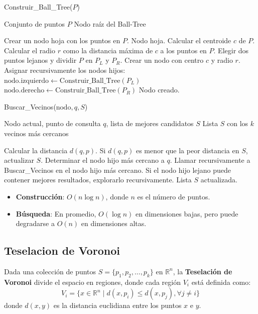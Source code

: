 \documentclass[titlepage,a4paper]{article}
\begin{document}
\begin{algorithm}
\caption{Construir\_Ball\_Tree(\( P \))}
\begin{algorithmic}[1]
\Require Conjunto de puntos \( P \)
\Ensure Nodo raíz del Ball-Tree

    \State Crear un nodo hoja con los puntos en \( P \).
    \State \Return Nodo hoja.
\EndIf
\State Calcular el centroide \( c \) de \( P \).
\State Calcular el radio \( r \) como la distancia máxima de \( c \) a los puntos en \( P \).
\State Elegir dos puntos lejanos y dividir \( P \) en \( P_L \) y \( P_R \).
\State Crear un nodo con centro \( c \) y radio \( r \).
\State Asignar recursivamente los nodos hijos:
\State \( \text{nodo.izquierdo} \gets \text{Construir\_Ball\_Tree}(P_L) \)
\State \( \text{nodo.derecho} \gets \text{Construir\_Ball\_Tree}(P_R) \)
\State \Return Nodo creado.
\end{algorithmic}
\end{algorithm}


\begin{algorithm}
\caption{Buscar\_Vecinos(\( \text{nodo}, q, S \))}
\begin{algorithmic}[1]
\Require Nodo actual, punto de consulta \( q \), lista de mejores candidatos \( S \)
\Ensure Lista \( S \) con los \( k \) vecinos más cercanos

        \State Calcular la distancia \( d(q, p) \).
        \State Si \( d(q, p) \) es menor que la peor distancia en \( S \), actualizar \( S \).
    \EndFor
    \State \Return
\EndIf
\State Determinar el nodo hijo más cercano a \( q \).
\State Llamar recursivamente a Buscar\_Vecinos en el nodo hijo más cercano.
\State Si el nodo hijo lejano puede contener mejores resultados, explorarlo recursivamente.
\State \Return Lista \( S \) actualizada.
\end{algorithmic}
\end{algorithm}


\begin{itemize}
    \item \textbf{Construcción}: \( O(n \log n) \), donde \( n \) es el número de puntos.
    \item \textbf{Búsqueda}: En promedio, \( O(\log n) \) en dimensiones bajas, pero puede degradarse a \( O(n) \) en dimensiones altas.
\end{itemize}
\subsection{Teselacion de Voronoi}
Dada una colección de puntos $S = \{ p_1, p_2, \dots, p_k \}$ en $\mathbb{R}^n$, la \textbf{Teselación de Voronoi} divide el espacio en regiones, donde cada región $V_i$ está definida como:
\[
V_i = \{ x \in \mathbb{R}^n \mid d(x, p_i) \leq d(x, p_j), \forall j \neq i \}
\]
donde $d(x, y)$ es la distancia euclidiana entre los puntos $x$ e $y$.
\end{document}
